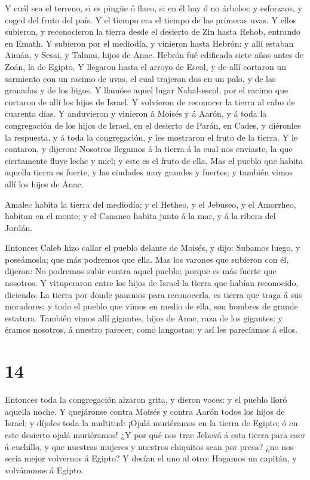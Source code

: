  Y cuál sea el terreno, si es pingüe ó flaco, si en él hay
ó no árboles: y esforzaos, y coged del fruto del país. Y el tiempo era
el tiempo de las primeras uvas.  Y ellos subieron, y
reconocieron la tierra desde el desierto de Zin hasta Rehob, entrando en
Emath.  Y subieron por el mediodía, y vinieron hasta
Hebrón: y allí estaban Aimán, y Sesai, y Talmai, hijos de Anac. Hebrón
fué edificada siete años antes de Zoán, la de Egipto.  Y
llegaron hasta el arroyo de Escol, y de allí cortaron un sarmiento con
un racimo de uvas, el cual trajeron dos en un palo, y de las granadas y
de los higos.  Y llamóse aquel lugar Nahal-escol, por el
racimo que cortaron de allí los hijos de Israel.  Y
volvieron de reconocer la tierra al cabo de cuarenta días. 
Y anduvieron y vinieron á Moisés y á Aarón, y á toda la congregación de
los hijos de Israel, en el desierto de Parán, en Cades, y diéronles la
respuesta, y á toda la congregación, y les mostraron el fruto de la
tierra.  Y le contaron, y dijeron: Nosotros llegamos á la
tierra á la cual nos enviaste, la que ciertamente fluye leche y miel; y
este es el fruto de ella.  Mas el pueblo que habita aquella
tierra es fuerte, y las ciudades muy grandes y fuertes; y también vimos
allí los hijos de Anac.

 Amalec habita la tierra del mediodía; y el Hetheo, y el
Jebuseo, y el Amorrheo, habitan en el monte; y el Cananeo habita junto á
la mar, y á la ribera del Jordán.

 Entonces Caleb hizo callar el pueblo delante de Moisés, y
dijo: Subamos luego, y poseámosla; que más podremos que ella.
 Mas los varones que subieron con él, dijeron: No podremos
subir contra aquel pueblo; porque es más fuerte que nosotros.
 Y vituperaron entre los hijos de Israel la tierra que
habían reconocido, diciendo: La tierra por donde pasamos para
reconocerla, es tierra que traga á sus moradores; y todo el pueblo que
vimos en medio de ella, son hombres de grande estatura. También vimos
allí gigantes, hijos de Anac, raza de los gigantes: y éramos nosotros, á
nuestro parecer, como langostas; y así les parecíamos á ellos.

\hypertarget{section-13}{%
\section{14}\label{section-13}}

 Entonces toda la congregación alzaron grita, y dieron
voces: y el pueblo lloró aquella noche.  Y quejáronse contra
Moisés y contra Aarón todos los hijos de Israel; y díjoles toda la
multitud: ¡Ojalá muriéramos en la tierra de Egipto; ó en este desierto
ojalá muriéramos!  ¿Y por qué nos trae Jehová á esta tierra
para caer á cuchillo, y que nuestras mujeres y nuestros chiquitos sean
por presa? ¿no nos sería mejor volvernos á Egipto?  Y decían
el uno al otro: Hagamos un capitán, y volvámonos á Egipto.

